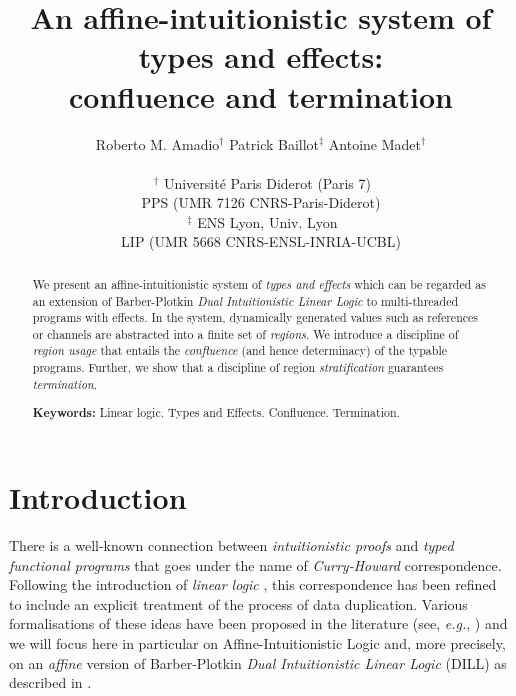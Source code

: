 \documentclass[11pt]{article}
\begin{document}
 
 
\title{An affine-intuitionistic system of types and effects: \\
       confluence and termination}

\author{Roberto M. Amadio$^{\dag}$ 
\quad  Patrick Baillot$^{\ddag}$ \quad
 Antoine Madet$^{\dag}$ \\ \\
{\footnotesize $~^{\dag}$ Universit\'e Paris Diderot (Paris 7)} \\
{\footnotesize PPS (UMR 7126 CNRS-Paris-Diderot)} \\ 
{\footnotesize $~^{\ddag}$ ENS  Lyon, Univ. Lyon} \\
{\footnotesize LIP (UMR 5668 CNRS-ENSL-INRIA-UCBL)} }



\maketitle 

\begin{abstract}
We present an affine-intuitionistic system of {\em types and effects} which
can be regarded as an extension  of Barber-Plotkin {\em Dual Intuitionistic Linear Logic}
to multi-threaded programs with effects. In the
system, dynamically generated values such as references or channels are
abstracted into a finite set of {\em regions}.  We introduce a discipline of
{\em region usage} that entails the {\em confluence} (and hence determinacy) of the
typable programs.  Further, we show that a discipline of region
{\em stratification} guarantees {\em termination}.

{\bf Keywords:} Linear logic. Types and Effects. Confluence. Termination.
\end{abstract}


\section{Introduction}\label{intro-sec}
There is a well-known connection between {\em
intuitionistic proofs} and {\em typed functional programs} that goes
under the name of {\em Curry-Howard} correspondence.  Following the
introduction of {\em linear logic} \cite{Girard87}, this correspondence has
been refined to include an explicit treatment of the process of data
duplication.  Various formalisations of these ideas have been proposed
in the literature (see, {\em e.g.}, \cite{BBPH93,Benton94,Plotkin93,MOTW95,Barber96}) 
and we will focus here in particular on Affine-Intuitionistic Logic and,
more precisely, on an {\em affine} version of Barber-Plotkin {\em Dual Intuitionistic
Linear Logic} (DILL) as described in \cite{Barber96}. 
\end{document}
